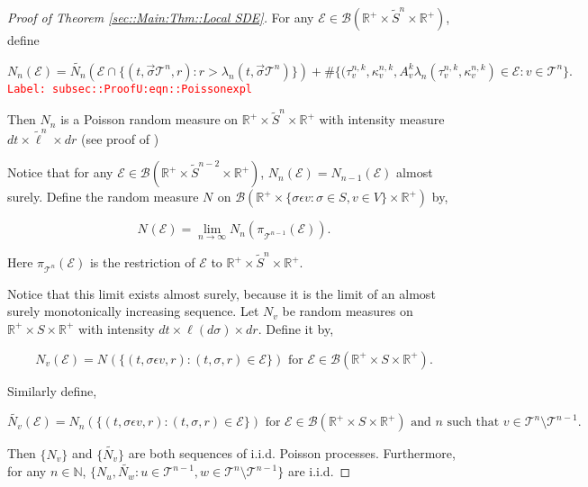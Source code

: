 \documentclass[12pt]{article}
\newcommand{\mb}{\mathbb}
\newcommand{\mc}{\mathcal}
\newcommand{\ms}{\mathscr}
\newcommand{\ra}{\rightarrow}
\newcommand{\te}{\text}
\newcommand{\ep}{\epsilon}
\newcommand{\tr}{\textcolor{red}}
\newcommand{\labe}[1]{\tr{\texttt{Label: #1}}}
\newcommand{\ind}{\hspace{24pt}}
\renewcommand{\v}{v}							%
\newcommand{\vv}{u}								%
\newcommand{\vvv}{w}							%
\renewcommand{\S}{S}							%
\newcommand{\s}{\sigma}							%
\newcommand{\sv}{\vec{\s}}						%
\newcommand{\ev}{\ep}							%
\renewcommand{\t}{t}							%
\newcommand{\poiss}[1]{N_{#1}}						%
\newcommand{\pup}[1]{^{#1}}							%
\newcommand{\tree}{\mc{T}}							%
\newcommand{\V}{V}									%
\renewcommand{\r}{r}								%
\newcommand{\rt}[1]{\tau^{#1}}						%
\renewcommand{\it}{k}								%
\newcommand{\numb}{n}								%
\newcommand{\XState}[1]{\S^{#1}}				%
\newcommand{\piV}[2]{\pi_{#1}^{#2}}					%
\newcommand{\rate}[1]{\lambda_{#1}}					%
\newcommand{\Sm}{\ell}								%
\newcommand{\alt}{\widetilde}						%
\newcommand{\rv}{A}								%
\newcommand{\evnt}{\mc{E}}						%
\renewcommand{\mark}[1]{\kappa^{#1}}				%
\begin{document}
\begin{proof}[Proof of Theorem \ref{sec::Main:Thm::Local SDE}]
For any \(\evnt \in \ms{B}(\mb{R}^+\times\alt{\S}^\numb\times\mb{R}^+)\), define

\begin{equation}
\poiss{\numb}(\evnt) = \alt{\poiss{\numb}}\left(\evnt\cap\{(t,\sv{\tree\pup{\numb}},\r):\r > \rate{\numb}(\t,\sv{\tree\pup{\numb}})\}\right) + \#\{(\rt{\numb,\it}_\v,\mark{\numb,\it}_\v,\rv_{\v}^{\it}\rate{\numb}(\rt{\numb,\it}_\v,\mark{\numb,\it}_\v) \in \evnt: \v\in \tree\pup{\numb}\}.
\label{subsec::ProofU:eqn::Poissonexpl}
\end{equation}
\labe{subsec::ProofU:eqn::Poissonexpl}

Then \(\poiss{\numb}\) is a Poisson random measure on \(\mb{R}^+\times\alt{\S}^\numb\times \mb{R}^+\) with intensity measure \(d\t\times \alt{\Sm}^\numb\times d\r\) (see proof of \cite[Theorem 14.7.1(b)]{DalVer08})

\ind Notice that for any \(\evnt \in \ms{B}(\mb{R}^+\times \alt{\S}^{\numb-2}\times \mb{R}^+)\), \(\poiss{\numb}(\evnt) = \poiss{\numb-1}(\evnt)\) almost surely. Define the random measure \(\poiss{}\) on \(\ms{B}(\mb{R}^+\times \{\s\ev{\v}:\s\in \S,\v \in \V\}\times \mb{R}^+)\) by,

\[\poiss{}(\evnt) = \lim_{\numb \ra\infty}\poiss{\numb}\left(\piV{\tree\pup{\numb-1}}{}(\evnt)\right).\]

Here \(\piV{\tree\pup{\numb}}{}(\evnt)\) is the restriction of \(\evnt\) to \(\mb{R}^+\times \alt{\S}^\numb\times\mb{R}^+\). 

\ind Notice that this limit exists almost surely, because it is the limit of an almost surely monotonically increasing sequence. Let \(\poiss{\v}\) be random measures on \(\mb{R}^+\times\S\times\mb{R}^+\) with intensity \(d\t\times\Sm(d\s)\times d\r\). Define it by,

\[\poiss{\v}(\evnt) = \poiss{}\left(\{(\t,\s\ev{\v},\r):(\t,\s,\r)\in \evnt\}\right) \te{ for } \evnt \in \ms{B}(\mb{R}^+\times\S\times\mb{R}^+).\]

Similarly define,

\[\alt{\poiss{\v}}(\evnt) = \poiss{\numb}\left(\{(\t,\s\ev{\v},\r):(\t,\s,\r)\in \evnt\}\right)\te{ for } \evnt \in \ms{B}(\mb{R}^+\times\S\times\mb{R}^+)\te{ and }\numb\te{ such that } \v\in \tree\pup{\numb}\setminus\tree\pup{\numb-1}.\]

Then \(\{\poiss{\v}\}\) and \(\{\alt{\poiss{\v}}\}\) are both sequences of i.i.d. Poisson processes. Furthermore, for any \(\numb \in \mb{N}\), \(\{\poiss{\vv},\alt{\poiss{\vvv}}:\vv\in \tree\pup{\numb-1},\vvv\in\tree\pup{\numb}\setminus\tree\pup{\numb-1}\}\) are i.i.d.


\end{proof}
\end{document}
